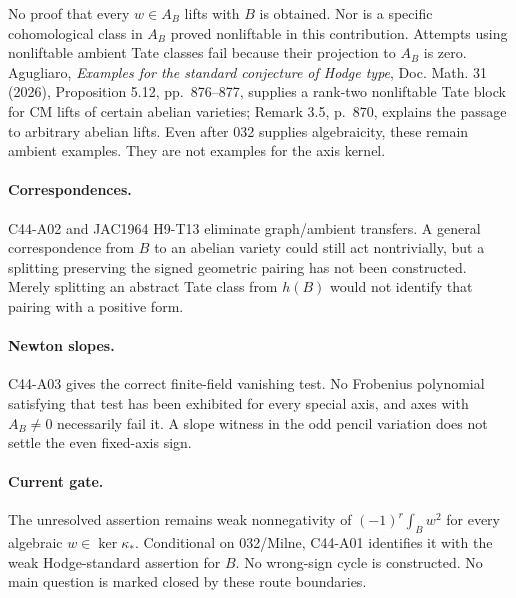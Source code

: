 No proof that every $w\in A_B$ lifts with $B$ is obtained.
Nor is a specific cohomological class in $A_B$ proved
nonliftable in this contribution. Attempts using nonliftable
ambient Tate classes fail because their projection to $A_B$
is zero. Agugliaro, \emph{Examples for the standard conjecture
of Hodge type}, Doc. Math. 31 (2026), Proposition 5.12,
pp.~876--877, supplies a rank-two nonliftable Tate block for
CM lifts of certain abelian varieties; Remark 3.5, p.~870,
explains the passage to arbitrary abelian lifts. Even after
032 supplies algebraicity, these remain ambient examples.
They are not examples for the axis kernel.

\paragraph{Correspondences.}
C44-A02 and JAC1964 H9-T13 eliminate graph/ambient transfers.
A general correspondence from $B$ to an abelian variety could
still act nontrivially, but a splitting preserving the signed
geometric pairing has not been constructed. Merely splitting
an abstract Tate class from $h(B)$ would not identify that
pairing with a positive form.

\paragraph{Newton slopes.}
C44-A03 gives the correct finite-field vanishing test.
No Frobenius polynomial satisfying that test has been exhibited
for every special axis, and axes with $A_B\ne0$ necessarily
fail it. A slope witness in the odd pencil variation does not
settle the even fixed-axis sign.

\paragraph{Current gate.}
The unresolved assertion remains weak nonnegativity of
$(-1)^r\int_Bw^2$ for every algebraic $w\in\ker\kappa_*$.
Conditional on 032/Milne, C44-A01 identifies it with the weak
Hodge-standard assertion for $B$. No wrong-sign cycle is
constructed. No main question is marked closed by these
route boundaries.
